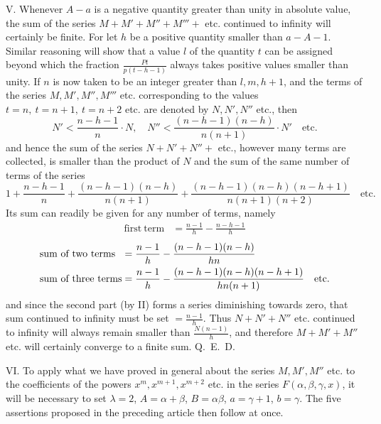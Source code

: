 V. Whenever $A-a$ is a negative quantity greater than unity in absolute value, the sum of the series $M+M'+M''+M'''+$ etc. continued to infinity will certainly be finite. For let $h$ be a positive quantity smaller than $a-A-1$. Similar reasoning will show that a value $l$ of the quantity $t$ can be assigned beyond which the fraction $\frac{Pt}{p(t-h-1)}$ always takes positive values smaller than unity. If $n$ is now taken to be an integer greater than $l,m,h+1$, and the terms of the series $M,M',M'',M'''$ etc. corresponding to the values $t=n,\ t=n+1,\ t=n+2$ etc. are denoted by $N,N',N''$ etc., then
\[
N'<\frac{n-h-1}{n}\cdot N,\quad
N''<\frac{(n-h-1)(n-h)}{n(n+1)}\cdot N'\quad\mathrm{etc.}
\]
and hence the sum of the series $N+N'+N''+$ etc., however many terms are collected, is smaller than the product of $N$ and the sum of the same number of terms of the series
\[
1+\frac{n-h-1}{n}+\frac{(n-h-1)(n-h)}{n(n+1)}+
\frac{(n-h-1)(n-h)(n-h+1)}{n(n+1)(n+2)}\quad\mathrm{etc.}
\]
Its sum can readily be given for any number of terms, namely
\[
\begin{array}{lr}
\mathrm{first\ term}&=\displaystyle\frac{n-1}{h}-\frac{n-h-1}{h}
\end{array}
\]
\[
\begin{array}{@{}l@{\;}l@{}}
\text{sum of two terms}&=\displaystyle\frac{n-1}{h}-\frac{(n-h-1)(n-h)}{hn}\\[7pt]
\text{sum of three terms}&=\displaystyle\frac{n-1}{h}-\frac{(n-h-1)(n-h)(n-h+1)}{hn(n+1)}\quad\text{etc.}
\end{array}
\]
and since the second part (by II) forms a series diminishing towards zero, that sum continued to infinity must be set $=\frac{n-1}{h}$. Thus $N+N'+N''$ etc. continued to infinity will always remain smaller than $\frac{N(n-1)}{h}$, and therefore $M+M'+M''$ etc. will certainly converge to a finite sum. Q.~E.~D.

VI. To apply what we have proved in general about the series $M,M',M''$ etc. to the coefficients of the powers $x^m,x^{m+1},x^{m+2}$ etc. in the series $F(\alpha,\beta,\gamma,x)$, it will be necessary to set $\lambda=2$, $A=\alpha+\beta$, $B=\alpha\beta$, $a=\gamma+1$, $b=\gamma$. The five assertions proposed in the preceding article then follow at once.

